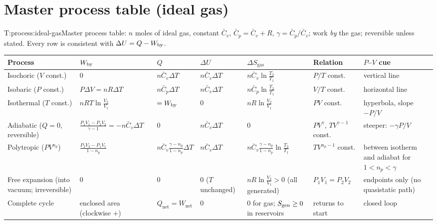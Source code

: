 \section{Master process table (ideal gas)}\label{sec:master}
\begin{reftab}{T:process:ideal-gas}{Master process table: $n$ moles of ideal gas, constant $\bar C_v$, $\bar C_p=\bar C_v+R$, $\gamma=\bar C_p/\bar C_v$; work \emph{by} the gas; reversible unless stated. Every row is consistent with $\Delta U=Q-W_{\mathrm{by}}$.}
\small
\renewcommand{\arraystretch}{1.5}
\setlength{\tabcolsep}{4pt}
\begin{tabularx}{\textwidth}{@{}L{0.10\textwidth}L{0.155\textwidth}L{0.13\textwidth}L{0.10\textwidth}L{0.16\textwidth}L{0.105\textwidth}Y@{}}
\toprule
Process & $W_{\mathrm{by}}$ & $Q$ & $\Delta U$ & $\Delta S_{\text{gas}}$ & Relation & $P$--$V$ cue\\
\midrule
Isochoric ($V$ const.) & $0$ & $n\bar C_v\Delta T$ & $n\bar C_v\Delta T$ & $n\bar C_v\ln\frac{T_2}{T_1}$ & $P/T$ const. & vertical line\\
Isobaric ($P$ const.) & $P\Delta V=nR\Delta T$ & $n\bar C_p\Delta T$ & $n\bar C_v\Delta T$ & $n\bar C_p\ln\frac{T_2}{T_1}$ & $V/T$ const. & horizontal line\\
Isothermal ($T$ const.) & $nRT\ln\frac{V_2}{V_1}$ & $=W_{\mathrm{by}}$ & $0$ & $nR\ln\frac{V_2}{V_1}$ & $PV$ const. & hyperbola, slope $-P/V$\\
Adiabatic ($Q=0$, reversible) & $\frac{P_1V_1-P_2V_2}{\gamma-1}=-n\bar C_v\Delta T$ & $0$ & $n\bar C_v\Delta T$ & $0$ & $PV^\gamma$, $TV^{\gamma-1}$ const. & steeper: $-\gamma P/V$\\
Polytropic ($PV^{n_p}$) & $\frac{P_2V_2-P_1V_1}{1-n_p}$ & $n\bar C_v\frac{\gamma-n_p}{1-n_p}\Delta T$ & $n\bar C_v\Delta T$ & $n\bar C_v\frac{\gamma-n_p}{1-n_p}\ln\frac{T_2}{T_1}$ & $TV^{n_p-1}$ const. & between isotherm and adiabat for $1<n_p<\gamma$\\
Free expansion (into vacuum; irreversible) & $0$ & $0$ & $0$ ($T$ unchanged) & $nR\ln\frac{V_2}{V_1}>0$ (all generated) & $P_1V_1=P_2V_2$ & endpoints only (no quasistatic path)\\
Complete cycle & enclosed area (clockwise $+$) & $Q_{\text{net}}=W_{\text{net}}$ & $0$ & $0$ for gas; $S_{\mathrm{gen}}\ge0$ in reservoirs & returns to start & closed loop\\
\bottomrule
\end{tabularx}\end{reftab}

